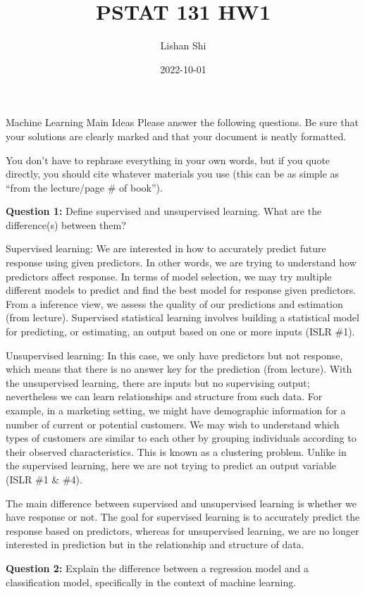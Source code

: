 \documentclass[
]{article}
\title{PSTAT 131 HW1}
\author{Lishan Shi}
\date{2022-10-01}
\begin{document}
\maketitle

Machine Learning Main Ideas Please answer the following questions. Be
sure that your solutions are clearly marked and that your document is
neatly formatted.

You don't have to rephrase everything in your own words, but if you
quote directly, you should cite whatever materials you use (this can be
as simple as ``from the lecture/page \# of book'').

\textbf{Question 1:} Define supervised and unsupervised learning. What
are the difference(s) between them?

Supervised learning: We are interested in how to accurately predict
future response using given predictors. In other words, we are trying to
understand how predictors affect response. In terms of model selection,
we may try multiple different models to predict and find the best model
for response given predictors. From a inference view, we assess the
quality of our predictions and estimation (from lecture). Supervised
statistical learning involves building a statistical model for
predicting, or estimating, an output based on one or more inputs (ISLR
\#1).

Unsupervised learning: In this case, we only have predictors but not
response, which means that there is no answer key for the prediction
(from lecture). With the unsupervised learning, there are inputs but no
supervising output; nevertheless we can learn relationships and
structure from such data. For example, in a marketing setting, we might
have demographic information for a number of current or potential
customers. We may wish to understand which types of customers are
similar to each other by grouping individuals according to their
observed characteristics. This is known as a clustering problem. Unlike
in the supervised learning, here we are not trying to predict an output
variable (ISLR \#1 \& \#4).

The main difference between supervised and unsupervised learning is
whether we have response or not. The goal for supervised learning is to
accurately predict the response based on predictors, whereas for
unsupervised learning, we are no longer interested in prediction but in
the relationship and structure of data.

\textbf{Question 2:} Explain the difference between a regression model
and a classification model, specifically in the context of machine
learning.
\end{document}
